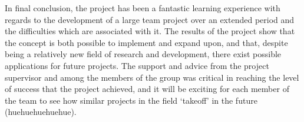 In final conclusion, the project has been a fantastic learning experience with regards to the development of a large team project over an extended period and the difficulties which are associated with it. The results of the project show that the concept is both possible to implement and expand upon, and that, despite being a relatively new field of research and development, there exist possible applications for future projects. The support and advice from the project supervisor and among the members of the group was critical in reaching the level of success that the project achieved, and it will be exciting for each member of the team to see how similar projects in the field ‘takeoff’ in the future (huehuehuehuehue).
